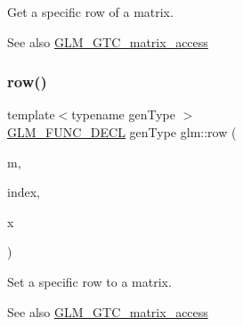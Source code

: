 Get a specific row of a matrix. \begin{DoxySeeAlso}{See also}
\mbox{\hyperlink{group__gtc__matrix__access}{G\+L\+M\+\_\+\+G\+T\+C\+\_\+matrix\+\_\+access}} 
\end{DoxySeeAlso}
\mbox{\label{group__gtc__matrix__access_gaadcc64829aadf4103477679e48c7594f}} 
\subsubsection{\texorpdfstring{row()}{row()}\hspace{0.1cm}{\footnotesize\ttfamily [2/2]}}
{\footnotesize\ttfamily template$<$typename gen\+Type $>$ \\
\mbox{\hyperlink{setup_8hpp_ab2d052de21a70539923e9bcbf6e83a51}{G\+L\+M\+\_\+\+F\+U\+N\+C\+\_\+\+D\+E\+CL}} gen\+Type glm\+::row (\begin{DoxyParamCaption}\item[{gen\+Type const \&}]{m,  }\item[{\mbox{\hyperlink{namespaceglm_a090a0de2260835bee80e71a702492ed9}{length\+\_\+t}}}]{index,  }\item[{typename gen\+Type\+::row\+\_\+type const \&}]{x }\end{DoxyParamCaption})}

Set a specific row to a matrix. \begin{DoxySeeAlso}{See also}
\mbox{\hyperlink{group__gtc__matrix__access}{G\+L\+M\+\_\+\+G\+T\+C\+\_\+matrix\+\_\+access}} 
\end{DoxySeeAlso}
